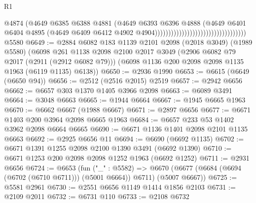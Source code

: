 \begin{lexlean}{R1}
\begin{coremodule}
                                                                @4874
                                                                (@4649
                                                                  @6385
                                                                  @6388
                                                                  @4881
                                                                  (@4649
                                                                    @6393
                                                                    @6396
                                                                    @4888
                                                                    (@4649
                                                                      @6401
                                                                      @6404
                                                                      @4895
                                                                      (@4649
                                                                        @6409
                                                                        @6412
                                                                        @4902
                                                                        @4904))))))))))))))))))))))))))))))))))
    @5580
@6649 := @2884
    @6082
    @183
    @1139
    @2101
    @2098
    (@2018 @3049)
    (@1989 @5580)
    (@6098
      @261
      @1138
      @2098
      @2100
      @2017
      @3049
      (@2906 @6082 @79 @2017 (@2911 (@2912 @6082 @79)))
      (@6098 @1136 @200 @2098 @2098 @1135 @1963 (@6119 @1135) @6138))
@6650 := @2936 @1990
@6653 := @6615 (@6649 (@6650 @94))
@6656 := @2512 (@2516 @2015) @2519
@6657 := @2942 @6656
@6662 := @6657 @303 @1370 @1405 @3966 @2098
@6663 := @6089 @3491
@6664 := @3048 @6663
@6665 := @1944 @6664
@6667 := @1945 @6665 @1963
@6670 := @6662 @6667 (@1988 @6667)
@6671 := @2897 @6656
@6677 := @6671 @1403 @200 @3964 @2098 @6665 @1963
@6684 := @6657 @233 @53 @1402 @3962 @2098 @6664 @6665
@6690 := @6671 @1136 @1401 @2098 @2101 @1135 @6663
@6692 := @2925 @6656 @11
@6694 := @6690 (@6692 @1135)
@6702 := @6671 @1391 @1255 @2098 @2100 @1390 @3491 (@6692 @1390)
@6710 := @6671 @1253 @200 @2098 @2098 @1252 @1963 (@6692 @1252)
@6711 := @2931 @6656
@6724 := @6653
    (fun ("_" : @5582) =>
    @6670 (@6677 (@6684 (@6694 (@6702 (@6710 @6711))) (@5001 @6664)) @6711) (@5007 @6667))
@6725 := @5581 @2961
@6730 := @2551 @6656 @1149 @1414 @1856 @2103
@6731 := @2109 @2011
@6732 := @6731 @110
@6733 := @2108 @6732

\end{coremodule}
\end{lexlean}
